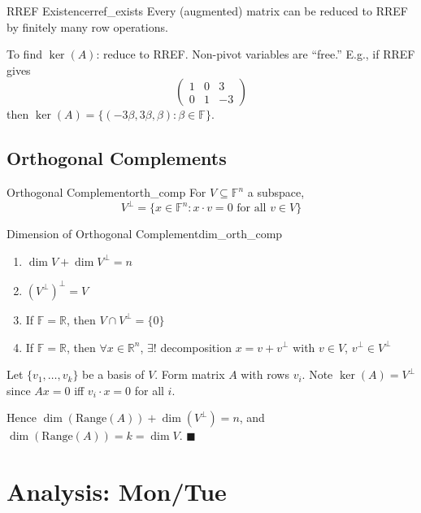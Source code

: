 \documentclass[11pt, letterpaper, openany]{book}
\renewenvironment{proof}[1][\proofname]{%
  \tcolorbox[blanker, breakable, left=1em,
    before skip=1em, after skip=1em,
    borderline west={2pt}{0pt}{MagicTeal!50},
    colback=MagicCream,
    before upper={\textcolor{MagicTeal}{\sffamily\bfseries #1.}\space}
  ]%
}{%
  \hfill\textcolor{MagicTeal}{\ensuremath{\blacksquare}}\endtcolorbox%
}
\begin{document}
\begin{lem}{RREF Existence}{rref_exists}
Every (augmented) matrix can be reduced to RREF by finitely many row operations.
\end{lem}

\begin{example}
To find $\ker(A)$: reduce to RREF. Non-pivot variables are ``free.'' E.g., if RREF gives
\[\begin{pmatrix} 1 & 0 & 3 \\ 0 & 1 & -3 \end{pmatrix}\]
then $\ker(A) = \{(-3\beta, 3\beta, \beta) : \beta \in \mathbb{F}\}$.
\end{example}

\subsection{Orthogonal Complements}

\begin{defn}{Orthogonal Complement}{orth_comp}
For $V \subseteq \mathbb{F}^n$ a subspace,
\[V^\perp = \{x \in \mathbb{F}^n : x \cdot v = 0 \text{ for all } v \in V\}\]
\end{defn}

\begin{thm}{Dimension of Orthogonal Complement}{dim_orth_comp}
\begin{enumerate}
    \item $\dim V + \dim V^\perp = n$
    \item $(V^\perp)^\perp = V$
    \item If $\mathbb{F} = \mathbb{R}$, then $V \cap V^\perp = \{0\}$
    \item If $\mathbb{F} = \mathbb{R}$, then $\forall x \in \mathbb{R}^n$, $\exists!$ decomposition $x = v + v^\perp$ with $v \in V$, $v^\perp \in V^\perp$
\end{enumerate}
\end{thm}

\begin{proof}[Proof of (1)]
Let $\{v_1, \ldots, v_k\}$ be a basis of $V$. Form matrix $A$ with rows $v_i$. Note $\ker(A) = V^\perp$ since $Ax = 0$ iff $v_i \cdot x = 0$ for all $i$.

Hence $\dim(\text{Range}(A)) + \dim(V^\perp) = n$, and $\dim(\text{Range}(A)) = k = \dim V$.
\end{proof}

\section{Analysis: Mon/Tue}
\end{document}
